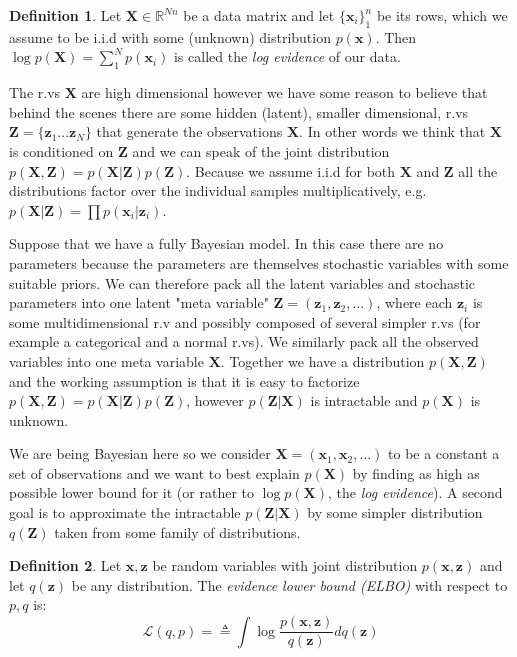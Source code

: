 \documentclass[11pt, a4paper]{report}
\theoremstyle{plain}
\theoremstyle{definition}
\newtheorem{mydef}{Definition}[chapter]
\theoremstyle{remark}
\newcommand{\R}{\mathbb{R}}
\newcommand{\bv}[1]{\boldsymbol{#1}}
\begin{document}
\begin{mydef}
\label{def:logevidence}
Let $\bv{X} \in \R^{Nn}$ be a data matrix and let $\{\bv{x}_i\}_1^n$ be its
rows, which we assume to be i.i.d with some (unknown) distribution $p(\bv{x})$.
Then $\log p(\bv{X}) = \sum_1^N p(\bv{x}_i)$ is called the \emph{log evidence} of our
data.
\end{mydef}

The r.vs $\bv{X}$ are high dimensional however
we have some reason to believe that behind the scenes there are some hidden
(latent), smaller dimensional, r.vs
$\bv{Z} = \{\bv{z}_1 \dots \bv{z}_N\}$ that generate the observations $\bv{X}$.
In other words we think that $\bv{X}$ is conditioned on $\bv{Z}$ and we can speak of
the joint distribution $p(\bv{X},\bv{Z}) = p(\bv{X}|\bv{Z})p(\bv{Z})$.
Because we assume i.i.d for both $\bv{X}$ and $\bv{Z}$ all the distributions factor
over the individual samples multiplicatively, e.g.
$p(\bv{X}|\bv{Z}) = \prod p(\bv{x}_i | \bv{z}_i)$.

Suppose that we have a fully Bayesian model. In this case there are no
parameters because the parameters are themselves stochastic variables with some
suitable priors. We can therefore pack all the latent variables and stochastic
parameters into one latent "meta variable" $\bv{Z} = (\bv{z}_1, \bv{z}_2, \dots )$,
where each $\bv{z}_i$
is some multidimensional r.v and possibly composed of several simpler r.vs (for
example a categorical and a normal r.vs).
We similarly pack all the observed variables into one meta variable $\bv{X}$.
Together we have a distribution $p(\bv{X},\bv{Z})$ and the working assumption is that it
is easy to factorize $p(\bv{X},\bv{Z}) = p(\bv{X}|\bv{Z})p(\bv{Z})$,
however $p(\bv{Z}|\bv{X})$ is intractable and
$p(\bv{X})$ is unknown.

We are being Bayesian here so we consider $\bv{X} = (\bv{x}_1, \bv{x}_2, \dots)$ to be
a constant a set of observations and we want to best explain $p(\bv{X})$ by finding as
high as possible lower bound for it (or rather to $\log p(\bv{X})$, the \emph{log
evidence}).
A second goal is to approximate the intractable $p(\bv{Z}|\bv{X})$ by some simpler
distribution $q(\bv{Z})$ taken from some family of distributions.

\begin{mydef}
Let $\bv{x},\bv{z}$ be random variables with joint
distribution $p(\bv{x},\bv{z})$ and let $q(\bv{z})$ be any distribution.
The \emph{evidence lower bound (ELBO)} with respect to $p,q$ is:
\begin{equation}
\label{def:elbo}
\mathcal{L}(q,p) = 
\triangleq \int \log \frac{p(\bv{x},\bv{z})}{q(\bv{z})} d q(\bv{z})
\end{equation}
\end{mydef}
\end{document}
